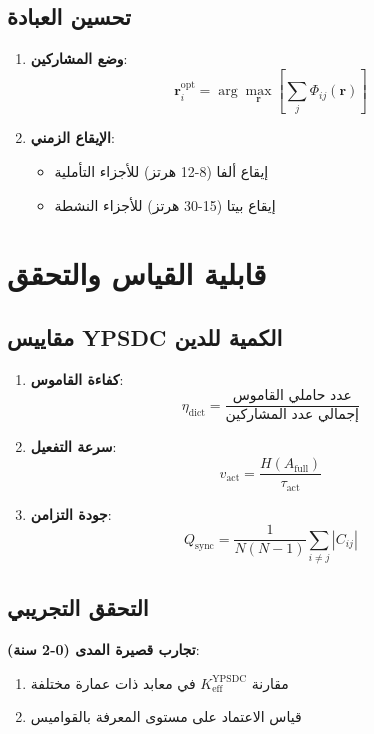 \documentclass[12pt,a4paper]{article}
\begin{document}
	\subsection{تحسين العبادة}
	
	\begin{enumerate}
		\item \textbf{وضع المشاركين}:
		\[
		\mathbf{r}_i^{\mathrm{opt}} = \arg\max_{\mathbf{r}} \left[\sum_j \Phi_{ij}(\mathbf{r})\right]
		\]
		\item \textbf{الإيقاع الزمني}:
		\begin{itemize}
			\item إيقاع ألفا (8-12 هرتز) للأجزاء التأملية
			\item إيقاع بيتا (15-30 هرتز) للأجزاء النشطة
		\end{itemize}
	\end{enumerate}
	
	\section{قابلية القياس والتحقق}
	
	\subsection{مقاييس YPSDC الكمية للدين}
	
	\begin{enumerate}
		\item \textbf{كفاءة القاموس}:
		\[
		\eta_{\mathrm{dict}} = \frac{\text{عدد حاملي القاموس}}{\text{إجمالي عدد المشاركين}}
		\]
		\item \textbf{سرعة التفعيل}:
		\[
		v_{\mathrm{act}} = \frac{H(A_{\mathrm{full}})}{\tau_{\mathrm{act}}}
		\]
		\item \textbf{جودة التزامن}:
		\[
		Q_{\mathrm{sync}} = \frac{1}{N(N-1)} \sum_{i \neq j} |C_{ij}|
		\]
	\end{enumerate}
	
	\subsection{التحقق التجريبي}
	
	\textbf{تجارب قصيرة المدى (0-2 سنة)}:
	\begin{enumerate}
		\item مقارنة $K_{\mathrm{eff}}^{\mathrm{YPSDC}}$ في معابد ذات عمارة مختلفة
		\item قياس الاعتماد على مستوى المعرفة بالقواميس
	\end{enumerate}
	
\end{document}

